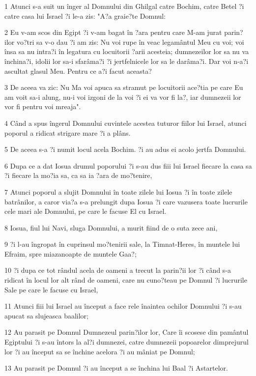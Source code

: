 \par 1 Atunci s-a suit un înger al Domnului din Ghilgal catre Bochim, catre Betel ?i catre casa lui Israel ?i le-a zis: "A?a graie?te Domnul:
\par 2 Eu v-am scos din Egipt ?i v-am bagat în ?ara pentru care M-am jurat parin?ilor vo?tri sa v-o dau ?i am zis: Nu voi rupe în veac legamântul Meu cu voi; voi însa sa nu intra?i în legatura cu locuitorii ?arii acesteia; dumnezeilor lor sa nu va închina?i, idolii lor sa-i sfarâma?i ?i jertfelnicele lor sa le darâma?i. Dar voi n-a?i ascultat glasul Meu. Pentru ce a?i facut aceasta?
\par 3 De aceea va zic: Nu Ma voi apuca sa stramut pe locuitorii ace?tia pe care Eu am voit sa-i alung, nu-i voi izgoni de la voi ?i ei va vor fi la?, iar dumnezeii lor vor fi pentru voi mreaja".
\par 4 Când a spus îngerul Domnului cuvintele acestea tuturor fiilor lui Israel, atunci poporul a ridicat strigare mare ?i a plâns.
\par 5 De aceea s-a ?i numit locul acela Bochim. ?i au adus ei acolo jertfa Domnului.
\par 6 Dupa ce a dat Iosua drumul poporului ?i s-au dus fiii lui Israel fiecare la casa sa ?i fiecare la mo?ia sa, ca sa ia ?ara de mo?tenire,
\par 7 Atunci poporul a slujit Domnului în toate zilele lui Iosua ?i în toate zilele batrânilor, a caror via?a s-a prelungit dupa Iosua ?i care vazusera toate lucrurile cele mari ale Domnului, pe care le facuse El cu Israel.
\par 8 Iosua, fiul lui Navi, sluga Domnului, a murit fiind de o suta zece ani,
\par 9 ?i l-au îngropat în cuprinsul mo?tenirii sale, la Timnat-Heres, în muntele lui Efraim, spre miazanoapte de muntele Gaa?;
\par 10 ?i dupa ce tot rândul acela de oameni a trecut la parin?ii lor ?i când s-a ridicat în locul lor alt rând de oameni, care nu cuno?teau pe Domnul ?i lucrurile Sale pe care le facuse cu Israel,
\par 11 Atunci fiii lui Israel au început a face rele înaintea ochilor Domnului ?i s-au apucat sa slujeasca baalilor;
\par 12 Au parasit pe Domnul Dumnezeul parin?ilor lor, Care îi scosese din pamântul Egiptului ?i s-au întors la al?i dumnezei, catre dumnezeii popoarelor dimprejurul lor ?i au început sa se închine acelora ?i au mâniat pe Domnul;
\par 13 Au parasit pe Domnul ?i au început a se închina lui Baal ?i Astartelor.
